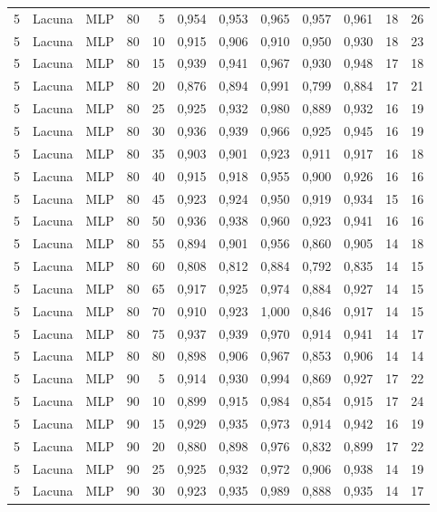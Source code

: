 \begin{longtable}{@{}rllrrrrrrrrr@{}}
5 & Lacuna & MLP & 80 & 5 & 0,954 & 0,953 & 0,965 & 0,957 & 0,961 & 18 & 26 \\
5 & Lacuna & MLP & 80 & 10 & 0,915 & 0,906 & 0,910 & 0,950 & 0,930 & 18 & 23 \\
5 & Lacuna & MLP & 80 & 15 & 0,939 & 0,941 & 0,967 & 0,930 & 0,948 & 17 & 18 \\
5 & Lacuna & MLP & 80 & 20 & 0,876 & 0,894 & 0,991 & 0,799 & 0,884 & 17 & 21 \\
5 & Lacuna & MLP & 80 & 25 & 0,925 & 0,932 & 0,980 & 0,889 & 0,932 & 16 & 19 \\
5 & Lacuna & MLP & 80 & 30 & 0,936 & 0,939 & 0,966 & 0,925 & 0,945 & 16 & 19 \\
5 & Lacuna & MLP & 80 & 35 & 0,903 & 0,901 & 0,923 & 0,911 & 0,917 & 16 & 18 \\
5 & Lacuna & MLP & 80 & 40 & 0,915 & 0,918 & 0,955 & 0,900 & 0,926 & 16 & 16 \\
5 & Lacuna & MLP & 80 & 45 & 0,923 & 0,924 & 0,950 & 0,919 & 0,934 & 15 & 16 \\
5 & Lacuna & MLP & 80 & 50 & 0,936 & 0,938 & 0,960 & 0,923 & 0,941 & 16 & 16 \\
5 & Lacuna & MLP & 80 & 55 & 0,894 & 0,901 & 0,956 & 0,860 & 0,905 & 14 & 18 \\
5 & Lacuna & MLP & 80 & 60 & 0,808 & 0,812 & 0,884 & 0,792 & 0,835 & 14 & 15 \\
5 & Lacuna & MLP & 80 & 65 & 0,917 & 0,925 & 0,974 & 0,884 & 0,927 & 14 & 15 \\
5 & Lacuna & MLP & 80 & 70 & 0,910 & 0,923 & 1,000 & 0,846 & 0,917 & 14 & 15 \\
5 & Lacuna & MLP & 80 & 75 & 0,937 & 0,939 & 0,970 & 0,914 & 0,941 & 14 & 17 \\
5 & Lacuna & MLP & 80 & 80 & 0,898 & 0,906 & 0,967 & 0,853 & 0,906 & 14 & 14 \\
5 & Lacuna & MLP & 90 & 5 & 0,914 & 0,930 & 0,994 & 0,869 & 0,927 & 17 & 22 \\
5 & Lacuna & MLP & 90 & 10 & 0,899 & 0,915 & 0,984 & 0,854 & 0,915 & 17 & 24 \\
5 & Lacuna & MLP & 90 & 15 & 0,929 & 0,935 & 0,973 & 0,914 & 0,942 & 16 & 19 \\
5 & Lacuna & MLP & 90 & 20 & 0,880 & 0,898 & 0,976 & 0,832 & 0,899 & 17 & 22 \\
5 & Lacuna & MLP & 90 & 25 & 0,925 & 0,932 & 0,972 & 0,906 & 0,938 & 14 & 19 \\
5 & Lacuna & MLP & 90 & 30 & 0,923 & 0,935 & 0,989 & 0,888 & 0,935 & 14 & 17 \\

\end{longtable}
